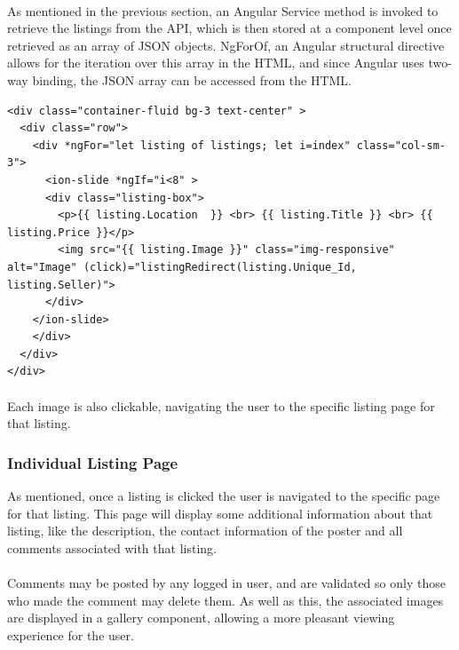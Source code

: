 \paragraph{}
As mentioned in the previous section, an Angular Service method is invoked to retrieve the listings from the API, which is then stored at a component level once retrieved as an array of JSON objects. NgForOf, an Angular structural directive allows for the iteration over this array in the HTML, and since Angular uses two-way binding, the JSON array can be accessed from the HTML. \newline

\begin{lstlisting}[caption=NgFor to Display Listings]
<div class="container-fluid bg-3 text-center" >    
  <div class="row">
    <div *ngFor="let listing of listings; let i=index" class="col-sm-3">
      <ion-slide *ngIf="i<8" >   
      <div class="listing-box">
        <p>{{ listing.Location  }} <br> {{ listing.Title }} <br> {{ listing.Price }}</p>
        <img src="{{ listing.Image }}" class="img-responsive" alt="Image" (click)="listingRedirect(listing.Unique_Id, listing.Seller)">
      </div>
    </ion-slide>
    </div>
  </div>
</div>
\end{lstlisting}

\paragraph{}
Each image is also clickable, navigating the user to the specific listing page for that listing.

\subsubsection{Individual Listing Page}
As mentioned, once a listing is clicked the user is navigated to the specific page for that listing. This page will display some additional information about that listing, like the description, the contact information of the poster and all comments associated with that listing.

\paragraph{}
Comments may be posted by any logged in user, and are validated so only those who made the comment may delete them. As well as this, the associated images are displayed in a gallery component, allowing a more pleasant viewing experience for the user.

